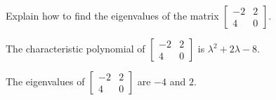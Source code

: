 
\begin{exerciseStatement}


Explain how to find the eigenvalues of the matrix \( \left[\begin{array}{cc}
-2 & 2 \\
4 & 0
\end{array}\right] \).


\end{exerciseStatement}
    
\begin{exerciseAnswer} 


The characteristic polynomial of \( \left[\begin{array}{cc}
-2 & 2 \\
4 & 0
\end{array}\right] \) is \( \lambda^{2} + 2 \lambda - 8 \).



The eigenvalues of \( \left[\begin{array}{cc}
-2 & 2 \\
4 & 0
\end{array}\right] \) are \( -4 \) and \( 2 \).


\end{exerciseAnswer}
    
